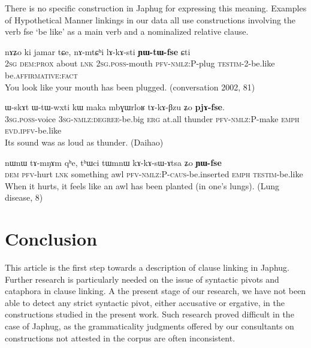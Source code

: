 \documentclass[oldfontcommands,oneside,a4paper,11pt]{article}
\newcommand{\ipa}[1]{{\phon \mbox{#1}}} %
\begin{document}
There is no specific construction in Japhug for expressing this meaning. Examples of Hypothetical Manner linkings in our data all use constructions involving the verb \ipa{fse} `be like' as a main verb and a nominalized relative clause.

\begin{exe}
\ex \label{ex:lAkAsti.YWtWfse}
\gll
\ipa{nɤʑo}         	\ipa{ki}         	\ipa{jamar}         	\ipa{tɕe,}         	\ipa{nɤ-mtɕʰi}         	\ipa{lɤ-kɤ-sti}         	\ipa{\textbf{ɲɯ-tɯ-fse}}         	\ipa{ɕti}     \\    
\textsc{2sg} \textsc{dem:prox} about \textsc{lnk} \textsc{2sg.poss}-mouth \textsc{pfv-nmlz:P}-plug \textsc{testim}-2-be.like be.\textsc{affirmative}:\textsc{fact} \\
\glt You look like your mouth has been plugged. (conversation 2002, 81)
\end{exe}


\begin{exe}
\ex \label{ex:mbGWrloR.tAkABzu}
\gll
      	\ipa{ɯ-skɤt}         	\ipa{ɯ-tɯ-wxti}         	\ipa{kɯ}         	\ipa{maka}         	\ipa{mbɣɯrloʁ}         	\ipa{tɤ-kɤ-βzu}         	\ipa{ʑo}         	\ipa{\textbf{pjɤ-fse}.}         \\
  \textsc{3sg.poss}-voice \textsc{3sg-nmlz:degree}-be.big \textsc{erg} at.all thunder \textsc{pfv-nmlz:P}-make \textsc{emph} \textsc{evd.ipfv}-be.like \\
\glt Its sound was as loud as thunder.  (Daihao)
\end{exe}
\begin{exe}
\ex \label{ex:tWmnW.tAkAsAtsa}
\gll
\ipa{nɯnɯ}         	\ipa{tɤ-mŋɤm}         	\ipa{qʰe,}         	\ipa{tʰɯci}         	\ipa{tɯmnɯ}         	\ipa{kɤ-kɤ-sɯ-ɤtsa}         	\ipa{ʑo}         	\ipa{\textbf{ɲɯ-fse}}         \\
\textsc{dem} \textsc{pfv}-hurt \textsc{lnk} something awl \textsc{pfv-nmlz:P-caus}-be.inserted  \textsc{emph} \textsc{testim}-be.like \\
\glt  When it hurts, it feels like an awl has been planted (in one's lungs).  (Lung disease, 8)
\end{exe}
 


\section{Conclusion}
This article is the first step towards a description of clause linking in Japhug. Further research is particularly needed on the issue of syntactic pivots and cataphora in clause linking. A the present stage of our research, we have not been able to detect any strict syntactic pivot, either accusative or ergative,  in the constructions studied in the present work. Such research  proved difficult in the case of Japhug,   as the grammaticality judgments offered by our consultants on constructions not attested in the corpus  are often inconsistent. 
\end{document}
